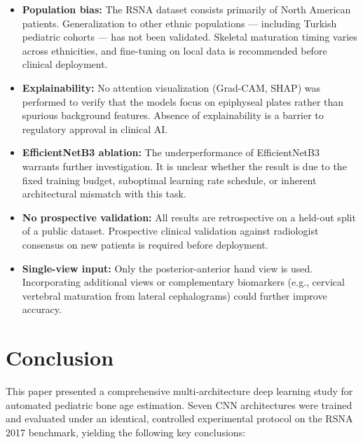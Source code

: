 \documentclass[conference]{IEEEtran}
\begin{document}
\begin{itemize}
  \item \textbf{Population bias:} The RSNA dataset consists primarily
        of North American patients. Generalization to other ethnic
        populations — including Turkish pediatric cohorts — has not
        been validated. Skeletal maturation timing varies across
        ethnicities, and fine-tuning on local data is recommended
        before clinical deployment.
  \item \textbf{Explainability:} No attention visualization
        (Grad-CAM, SHAP) was performed to verify that the models
        focus on epiphyseal plates rather than spurious background
        features. Absence of explainability is a barrier to
        regulatory approval in clinical AI.
  \item \textbf{EfficientNetB3 ablation:} The underperformance of
        EfficientNetB3 warrants further investigation. It is unclear
        whether the result is due to the fixed training budget,
        suboptimal learning rate schedule, or inherent architectural
        mismatch with this task.
  \item \textbf{No prospective validation:} All results are
        retrospective on a held-out split of a public dataset.
        Prospective clinical validation against radiologist consensus
        on new patients is required before deployment.
  \item \textbf{Single-view input:} Only the posterior-anterior
        hand view is used. Incorporating additional views or
        complementary biomarkers (e.g., cervical vertebral
        maturation from lateral cephalograms) could further
        improve accuracy.
\end{itemize}

\section{Conclusion}

This paper presented a comprehensive multi-architecture deep learning
study for automated pediatric bone age estimation. Seven CNN
architectures were trained and evaluated under an identical, controlled
experimental protocol on the RSNA 2017 benchmark, yielding the
following key conclusions:
\end{document}
